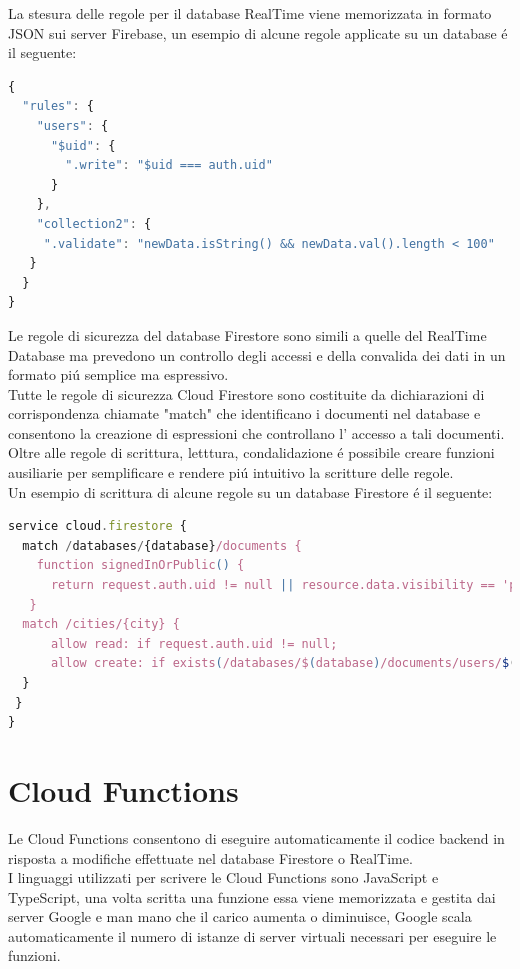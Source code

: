 La stesura delle regole per il database RealTime viene memorizzata in formato JSON sui server Firebase, un esempio di alcune regole applicate su un database \'e il seguente:


\begin{lstlisting}[language=javascript,caption={Firebase Rules esempio }]
{
  "rules": {
    "users": {
      "$uid": {
        ".write": "$uid === auth.uid"
      }
    },
    "collection2": {
     ".validate": "newData.isString() && newData.val().length < 100"
   }
  }
}
\end{lstlisting}




Le regole di sicurezza del database Firestore sono simili a quelle del RealTime Database ma prevedono un controllo degli accessi e della convalida dei dati in un formato pi\'u semplice ma espressivo.\\
Tutte le regole di sicurezza Cloud Firestore sono costituite da dichiarazioni di corrispondenza chiamate "match" che identificano i documenti nel database e consentono la creazione di espressioni che controllano l' accesso a tali documenti.\\
Oltre alle regole di scrittura, letttura, condalidazione \'e possibile creare funzioni ausiliarie per semplificare e rendere pi\'u intuitivo la scritture delle regole.\\
Un esempio di scrittura di alcune regole su un database Firestore \'e il seguente:

\begin{lstlisting}[language=javascript,caption={Firestore Rules}]
service cloud.firestore {
  match /databases/{database}/documents {
    function signedInOrPublic() {
      return request.auth.uid != null || resource.data.visibility == 'public';
   }
  match /cities/{city} {
      allow read: if request.auth.uid != null;
      allow create: if exists(/databases/$(database)/documents/users/$(request.auth.uid))
  }
 }
}
\end{lstlisting}



\section{Cloud Functions}                 %

Le Cloud Functions consentono di eseguire automaticamente il codice backend in risposta a modifiche effettuate nel database Firestore o RealTime.\\
I linguaggi utilizzati per scrivere le Cloud Functions sono JavaScript e TypeScript, una volta scritta una funzione essa viene memorizzata e gestita dai server Google e man mano che il carico aumenta o diminuisce, Google scala automaticamente il numero di istanze di server virtuali necessari per eseguire le funzioni.


